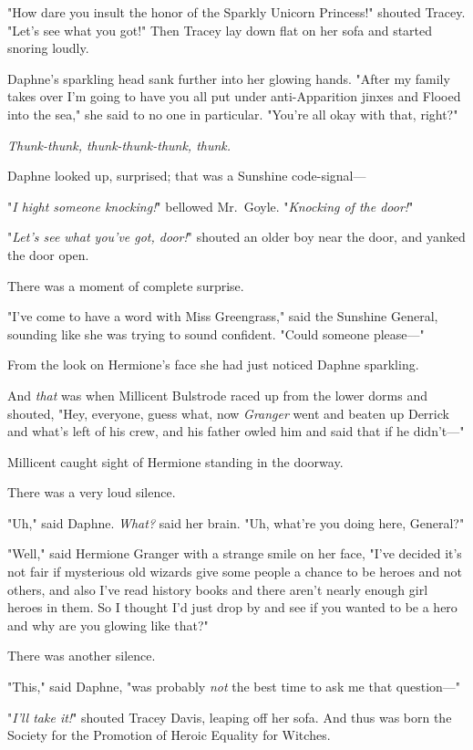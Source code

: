 "How dare you insult the honor of the Sparkly Unicorn Princess!" shouted
Tracey. "Let's see what you got!" Then Tracey lay down flat on her sofa and
started snoring loudly.

Daphne's sparkling head sank further into her glowing hands. "After my family
takes over I'm going to have you all put under anti-Apparition jinxes and
Flooed into the sea," she said to no one in particular. "You're all okay with
that, right?"

\emph{Thunk-thunk, thunk-thunk-thunk, thunk.}

Daphne looked up, surprised; that was a Sunshine code-signal---

"\emph{I hight someone knocking!}" bellowed Mr.~Goyle. "\emph{Knocking of the
door!}"

"\emph{Let's see what you've got, door!}" shouted an older boy near the door,
and yanked the door open.

There was a moment of complete surprise.

"I've come to have a word with Miss Greengrass," said the Sunshine General,
sounding like she was trying to sound confident. "Could someone please---"

From the look on Hermione's face she had just noticed Daphne sparkling.

And \emph{that} was when Millicent Bulstrode raced up from the lower dorms and
shouted, "Hey, everyone, guess what, now \emph{Granger} went and beaten up
Derrick and what's left of his crew, and his father owled him and said that if
he didn't---"

Millicent caught sight of Hermione standing in the doorway.

There was a very loud silence.

"Uh," said Daphne. \emph{What?} said her brain. "Uh, what're you doing here,
General?"

"Well," said Hermione Granger with a strange smile on her face, "I've decided
it's not fair if mysterious old wizards give some people a chance to be heroes
and not others, and also I've read history books and there aren't nearly enough
girl heroes in them. So I thought I'd just drop by and see if you wanted to be
a hero and why are you glowing like that?"

There was another silence.

"This," said Daphne, "was probably \emph{not} the best time to ask me that
question---"

"\emph{I'll take it!}" shouted Tracey Davis, leaping off her sofa.
\later
And thus was born the Society for the Promotion of Heroic Equality for Witches.
